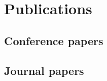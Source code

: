 \chapter{Publications}
\label{chap:publications}

\begin{refsection}
	\section*{Conference papers}
		
	\section*{Journal papers}
\end{refsection}